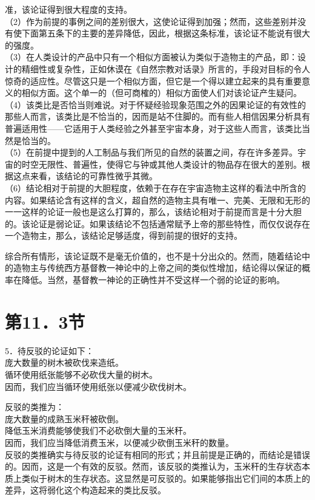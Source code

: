 准，该论证得到很大程度的支持。\\
（2）作为前提的事例之间的差别很大，这使论证得到加强；然而，这些差别并没有使下面第五条下的主要的差异降低，因此，根据这条标准，该论证不能说有很大的强度。\\
（3）在人类设计的产品中只有一个相似方面被认为类似于造物主的产品，即：设计的精细性或复杂性，正如休谟在《自然宗教对话录》所言的，手段对目标的令人惊奇的适应性。尽管这只是一个相似方面，但它是一个得以建立起来的具有重要意义的相似方面。这个单一的（但可商榷的）相似方面使人们对该论证产生疑问。\\
（4）该类比是否恰当则难说。对于怀疑经验现象范围之外的因果论证的有效性的那些人而言，该类比是不恰当的，因而是站不住脚的。而有些人相信因果分析具有普遍适用性——它适用于人类经验之外甚至宇宙本身，对于这些人而言，该类比当然是恰当的。\\
（5）在前提中提到的人工制品与我们所见的自然的装置之间，存在许多差异。宇宙的时空无限性、普遍性，使得它与钟或其他人类设计的物品存在很大的差别。根据这点来看，该结论的可靠性微乎其微。\\
（6）结论相对于前提的大胆程度，依赖于在存在宇宙造物主这样的看法中所含的内容。如果结论含有这样的含义，超自然的造物主具有唯一、完美、无限和无形的一一这样的论证一般也是这么打算的，那么，该结论相对于前提而言是十分大胆的。该论证是弱论证。如果该结论不包括通常赋予上帝的那些特性，而仅仅说存在一个造物主，那么，该结论足够适度，得到前提的很好的支持。

综合所有情形，该论证既不是毫无价值的，也不是十分出众的。然而，随着结论中的造物主与传统西方基督教一神论中的上帝之间的类似性增加，结论得以保证的概率在降低。当然，基督教一神论的正确性并不受这样一个弱的论证的影响。

\section*{第11．3节}
5．待反驳的论证如下：\\
庞大数量的树木被砍伐来造纸。\\
循环使用纸张能够不必砍伐大量的树木。\\
因而，我们应当循环使用纸张以便减少砍伐树木。

反驳的类推为：\\
庞大数量的成熟玉米秆被砍倒。\\
降低玉米消费能够使我们不必砍倒大量的玉米秆。\\
因而，我们应当降低消费玉米，以便减少砍倒玉米秆的数量。\\
反驳的类推确实与待反驳的论证有相同的形式；并且前提是正确的，而结论是错误的。因而，这是一个有效的反驳。然而，该反驳的类推认为，玉米秆的生存状态本质上类似于树木的生存状态。这显然是可反驳的。如果能够指出它们间的本质上的差异，这将弱化这个构造起来的类比反驳。

